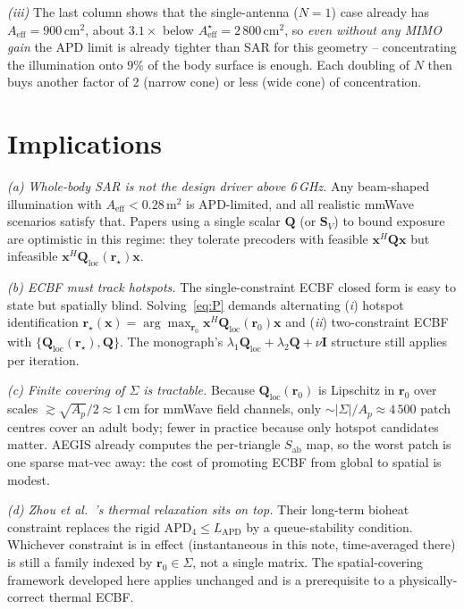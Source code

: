 \documentclass[journal]{IEEEtran}
\newcommand{\rr}{\bm{r}}
\newcommand{\xx}{\bm{x}}
\newcommand{\Sab}{S_{\mathrm{ab}}}
\newcommand{\APD}{\mathrm{APD}}
\newcommand{\Q}{\mathbf{Q}}
\newcommand{\Aeff}{A_{\mathrm{eff}}}
\begin{document}
\emph{(iii)} The last column shows that the single-antenna
($N\!=\!1$) case already has $\Aeff\!=\!900\,\mathrm{cm}^2$, about
$3.1\times$ below $\Aeff^\star\!=\!2\,800\,\mathrm{cm}^2$, so
\emph{even without any MIMO gain} the APD limit is already tighter
than SAR for this geometry -- concentrating the illumination onto
$9\%$ of the body surface is enough. Each doubling of $N$ then buys
another factor of 2 (narrow cone) or less (wide cone) of
concentration.

\section{Implications}\label{sec:implications}

\emph{(a) Whole-body SAR is not the design driver above 6\,GHz.} Any
beam-shaped illumination with $\Aeff\!<\!0.28\,\mathrm{m}^2$ is
APD-limited, and all realistic mmWave scenarios satisfy that.
Papers using a single scalar $\Q$ (or $\mathbf S_V$) to bound
exposure are optimistic in this regime:
they tolerate precoders with feasible $\xx^H\Q\xx$ but infeasible
$\xx^H\Q_{\mathrm{loc}}(\rr_\star)\xx$.

\emph{(b) ECBF must track hotspots.} The single-constraint ECBF
closed form is easy to state but spatially blind. Solving~\eqref{eq:P}
demands alternating (\emph{i}) hotspot identification
$\rr_\star(\xx)=\arg\max_{\rr_0}\xx^H\Q_{\mathrm{loc}}(\rr_0)\xx$
and (\emph{ii}) two-constraint ECBF with
$\{\Q_{\mathrm{loc}}(\rr_\star),\Q\}$. The monograph's
$\lambda_1\Q_{\mathrm{loc}}+\lambda_2\Q+\nu\mathbf I$ structure still
applies per iteration.

\emph{(c) Finite covering of $\Sigma$ is tractable.} Because
$\Q_{\mathrm{loc}}(\rr_0)$ is Lipschitz in $\rr_0$ over scales
$\gtrsim\!\sqrt{A_p}/2\!\approx\!1\,\mathrm{cm}$ for mmWave field
channels, only $\sim\!|\Sigma|/A_p\!\approx\!4\,500$ patch centres
cover an adult body; fewer in practice because only hotspot
candidates matter. AEGIS already computes the per-triangle $\Sab$ map,
so the worst patch is one sparse mat-vec away: the cost of promoting
ECBF from global to spatial is modest.

\emph{(d) Zhou \emph{et al.}~\cite{Zhou2026}'s thermal relaxation sits
on top.} Their long-term bioheat constraint replaces the rigid
$\APD_4\!\le\!L_{\APD}$ by a queue-stability condition. Whichever
constraint is in effect (instantaneous in this note, time-averaged
there) is still a family indexed by $\rr_0\in\Sigma$, not a single
matrix. The spatial-covering framework developed here applies
unchanged and is a prerequisite to a physically-correct thermal ECBF.
\end{document}
